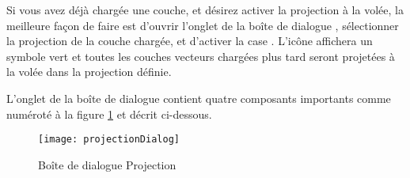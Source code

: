 Si vous avez d\'ej\`a charg\'ee une couche, et d\'esirez activer la projection \`a la
vol\'ee, la meilleure fa\c{c}on de faire est d'ouvrir l'onglet  de la bo\^ite de dialogue , s\'electionner la projection de la couche charg\'ee, et d'activer la case
. L'ic\^one
 affichera un symbole vert et
toutes les couches vecteurs charg\'ees plus tard seront projet\'ees \`a la vol\'ee dans
la projection d\'efinie.

L'onglet  de la bo\^ite de dialogue
 contient quatre composants importants comme
num\'erot\'e \`a la figure \ref{fig:projections} et d\'ecrit ci-dessous.

\begin{figure}[ht]
   \begin{center}
   \caption{Bo\^ite de dialogue
Projection\nixcaption}\label{fig:projections}\smallskip
   \texttt{[image: projectionDialog]}
\end{center}
\end{figure}

